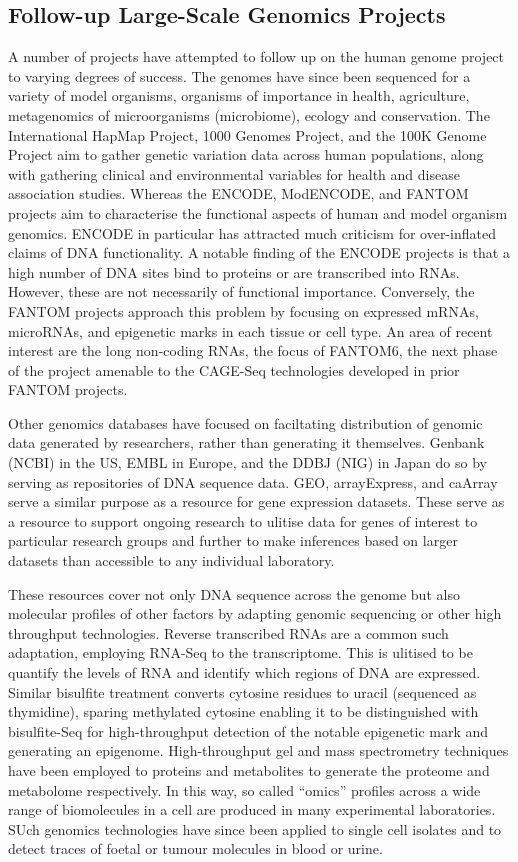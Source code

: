 \subsection{Follow-up Large-Scale Genomics Projects}
A number of projects have attempted to follow up on the human genome project to varying degrees of success. The genomes have since been sequenced for a variety of model organisms, organisms of importance in health, agriculture, metagenomics of microorganisms (microbiome), ecology and conservation. The International HapMap Project, 1000 Genomes Project, and the 100K Genome Project aim to gather genetic variation data across human populations, along with gathering clinical and environmental variables for health and disease association studies. Whereas the ENCODE, ModENCODE, and FANTOM projects aim to characterise the functional aspects of human and model organism genomics. ENCODE in particular has attracted much criticism for over-inflated claims of DNA functionality. A notable finding of the ENCODE projects is that a high number of DNA sites bind to proteins or are transcribed into RNAs. However, these are not necessarily of functional importance. Conversely, the FANTOM projects approach this problem by focusing on expressed mRNAs, microRNAs, and epigenetic marks in each tissue or cell type. An area of recent interest are the long non-coding RNAs, the focus of FANTOM6, the next phase of the project amenable to the CAGE-Seq technologies developed in prior FANTOM projects.

Other genomics databases have focused on faciltating distribution of genomic data generated by researchers, rather than generating it themselves. Genbank (NCBI) in the US, EMBL in Europe, and the DDBJ (NIG) in Japan do so by serving as repositories of DNA sequence data. GEO, arrayExpress, and caArray serve a similar purpose as a resource for gene expression datasets. These serve as a resource to support ongoing research to ulitise data for genes of interest to particular research groups and further to make inferences based on larger datasets than accessible to any individual laboratory.

These resources cover not only DNA sequence across the genome but also molecular profiles of other factors by adapting genomic sequencing or other high throughput technologies. Reverse transcribed RNAs are a common such adaptation, employing RNA-Seq to the transcriptome. This is ulitised to be quantify the levels of RNA and identify which regions of DNA are expressed. Similar bisulfite treatment converts cytosine residues to uracil (sequenced as thymidine), sparing methylated cytosine enabling it to be distinguished with bisulfite-Seq for high-throughput detection of the notable epigenetic mark and generating an epigenome. High-throughput gel and mass spectrometry techniques have been employed to proteins and metabolites to generate the proteome and metabolome respectively. In this way, so called ``omics'' profiles across a wide range of biomolecules in a cell are produced in many experimental laboratories. SUch genomics technologies have since been applied to single cell isolates and to detect traces of foetal or tumour molecules in blood or urine.

